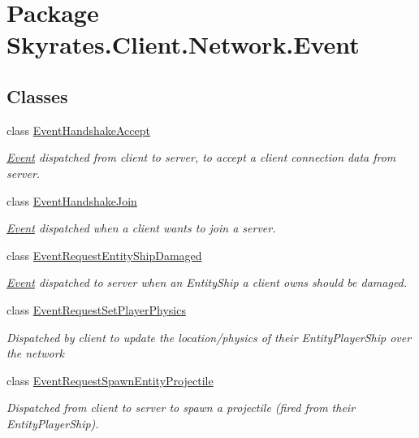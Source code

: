 \hypertarget{namespace_skyrates_1_1_client_1_1_network_1_1_event}{\section{Package Skyrates.\-Client.\-Network.\-Event}
\label{namespace_skyrates_1_1_client_1_1_network_1_1_event}
}
\subsection*{Classes}
\begin{DoxyCompactItemize}
\item 
class \hyperlink{class_skyrates_1_1_client_1_1_network_1_1_event_1_1_event_handshake_accept}{Event\-Handshake\-Accept}
\begin{DoxyCompactList}\small\item\em \hyperlink{namespace_skyrates_1_1_client_1_1_network_1_1_event}{Event} dispatched from client to server, to accept a client connection data from server. \end{DoxyCompactList}\item 
class \hyperlink{class_skyrates_1_1_client_1_1_network_1_1_event_1_1_event_handshake_join}{Event\-Handshake\-Join}
\begin{DoxyCompactList}\small\item\em \hyperlink{namespace_skyrates_1_1_client_1_1_network_1_1_event}{Event} dispatched when a client wants to join a server. \end{DoxyCompactList}\item 
class \hyperlink{class_skyrates_1_1_client_1_1_network_1_1_event_1_1_event_request_entity_ship_damaged}{Event\-Request\-Entity\-Ship\-Damaged}
\begin{DoxyCompactList}\small\item\em \hyperlink{namespace_skyrates_1_1_client_1_1_network_1_1_event}{Event} dispatched to server when an Entity\-Ship a client owns should be damaged. \end{DoxyCompactList}\item 
class \hyperlink{class_skyrates_1_1_client_1_1_network_1_1_event_1_1_event_request_set_player_physics}{Event\-Request\-Set\-Player\-Physics}
\begin{DoxyCompactList}\small\item\em Dispatched by client to update the location/physics of their Entity\-Player\-Ship over the network \end{DoxyCompactList}\item 
class \hyperlink{class_skyrates_1_1_client_1_1_network_1_1_event_1_1_event_request_spawn_entity_projectile}{Event\-Request\-Spawn\-Entity\-Projectile}
\begin{DoxyCompactList}\small\item\em Dispatched from client to server to spawn a projectile (fired from their Entity\-Player\-Ship). \end{DoxyCompactList}\end{DoxyCompactItemize}
